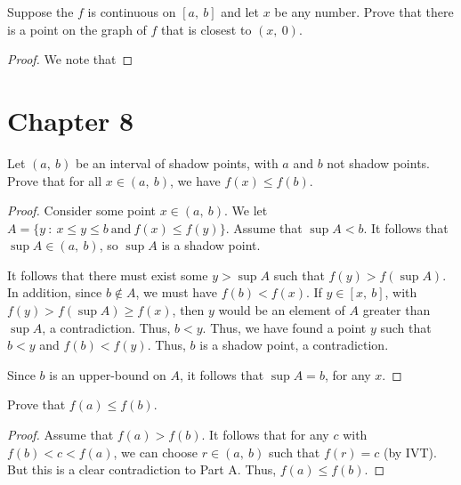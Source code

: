 \documentclass[10pt, oneside]{amsart}
\newenvironment{problem}[2][Problem]{\begin{trivlist}
\item[\hskip \labelsep {\bfseries #1}\hskip \labelsep {\bfseries #2.}]}{\end{trivlist}}
\begin{document}
    \begin{problem}{7.18}
	    Suppose the $f$ is continuous on $[a, \ b]$ and let $x$ be any number. Prove that there is a point on the graph of $f$ that 
	    is closest to $(x, \ 0)$.
    \end{problem}

    \begin{proof}
	We note that 
    \end{proof}

    \section{Chapter 8}

    \begin{problem}{8.20a}
      Let $(a, \ b)$ be an interval of shadow points, with $a$ and $b$ not shadow points. Prove that for all $x \in (a, \ b)$, we have
      $f(x) \leq f(b)$.
    \end{problem}

    \begin{proof}
      Consider some point $x \in (a, \ b)$. We let $A = \{y \ : \ x \leq y \leq b \ \text{and} \ f(x) \leq f(y)\}$. Assume that $\sup A < b$. It follows
      that $\sup A \in (a, \ b)$, so $\sup A$ is a shadow point.
      \newline

      It follows that there must exist some $y > \sup A$ such that $f(y) > f(\sup A)$. In addition, since $b \notin A$, we must have $f(b) < f(x)$. If $y \in [x, \ b]$, with $f(y) > f(\sup A) \geq f(x)$, then $y$ would
      be an element of $A$ greater than $\sup A$, a contradiction. Thus, $b < y$. Thus, we have found a point $y$ such that $b < y$ and $f(b) < f(y)$. Thus, $b$ is a shadow point, a contradiction.
      \newline

      Since $b$ is an upper-bound on $A$, it follows that $\sup A = b$, for any $x$. 
    \end{proof}

    \begin{problem}{8.20b}
      Prove that $f(a) \leq f(b)$.
    \end{problem}

    \begin{proof}
      Assume that $f(a) > f(b)$. It follows that for any $c$ with $f(b) < c < f(a)$, we can choose $r \in (a, \ b)$ such that $f(r) = c$ (by IVT). But this is a clear contradiction
      to Part A. Thus, $f(a) \leq f(b)$.
    \end{proof}
\end{document}
